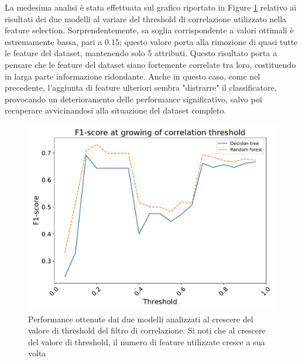 La medesima analisi è stata effettuata sul grafico riportato in Figure \ref{fig:corr-perf} relativo ai risultati dei due modelli al variare del threshold di correlazione utilizzato nella feature selection. Sorprendentemente, sa soglia corrispondente a valori ottimali è estremamente bassa, pari a $0.15$; questo valore porta alla rimozione di quasi tutte le feature del dataset, mantenendo solo 5 attributi. Questo risultato porta a pensare che le feature del dataset siano fortemente correlate tra loro, costituendo in larga parte informazione ridondante. Anche in questo caso, come nel precedente, l'aggiunta di feature ulteriori sembra "distrarre" il classificatore, provocando un deterioramento delle performance significativo, salvo poi recuperare avvicinandosi alla situazione del dataset completo.
\begin{figure}
	\centering
	\includegraphics[width=1\linewidth]{images/corr-perf}
	\caption{Performance ottenute dai due modelli analizzati al crescere del valore di threshold del filtro di correlazione. Si noti che al crescere del valore di threshold, il numero di feature utilizzate cresce a sua volta}
	\label{fig:corr-perf}
\end{figure}

